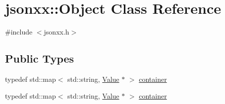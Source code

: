 \hypertarget{classjsonxx_1_1_object}{}\section{jsonxx\+:\+:Object Class Reference}
\label{classjsonxx_1_1_object}


{\ttfamily \#include $<$jsonxx.\+h$>$}

\subsection*{Public Types}
\begin{DoxyCompactItemize}
\item 
typedef std\+::map$<$ std\+::string, \hyperlink{classjsonxx_1_1_value}{Value} $\ast$ $>$ \hyperlink{classjsonxx_1_1_object_af02f54697643d924551867c0e959ee09}{container}
\item 
typedef std\+::map$<$ std\+::string, \hyperlink{classjsonxx_1_1_value}{Value} $\ast$ $>$ \hyperlink{classjsonxx_1_1_object_af02f54697643d924551867c0e959ee09}{container}
\end{DoxyCompactItemize}
